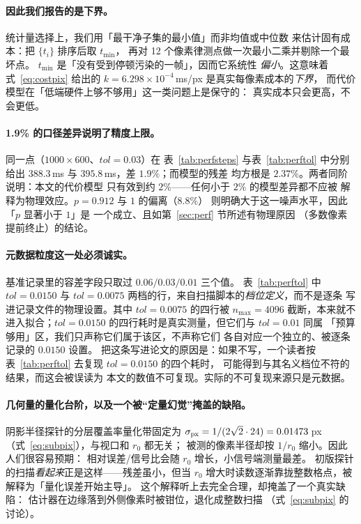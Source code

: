\paragraph{因此我们报告的是下界。}
统计量选择上，我们用「最干净子集的最小值」而非均值或中位数
来估计固有成本：把 $\{t_i\}$ 排序后取 $t_{\min}$，
再对 12 个像素律测点做一次最小二乘并剔除一个最坏点。
$t_{\min}$ 是「没有受到停顿污染的一帧」，因而它系统性
\emph{偏小}。这意味着式~\eqref{eq:costpix} 给出的
$k=6.298\times10^{-4}$\,ms/px 是真实每像素成本的\emph{下界}，
而代价模型在「低端硬件上够不够用」这一类问题上是保守的：
真实成本只会更高，不会更低。

\paragraph{1.9\% 的口径差异说明了精度上限。}
同一点（$1000\times600$、$tol=0.03$）在
表~\ref{tab:perfsteps} 与表~\ref{tab:perftol} 中分别给出
$388.3$\,ms 与 $395.8$\,ms，差 $1.9\%$；而模型的残差
均方根是 $2.37\%$。两者同阶说明：本文的代价模型
只有效到约 $2\%$——任何小于 $2\%$ 的模型差异都不应被
解释为物理效应。$p=0.912$ 与 $1$ 的偏离（$8.8\%$）
则明确大于这一噪声水平，因此「$p$ 显著小于 $1$」是
一个成立、且如第~\ref{sec:perf} 节所述有物理原因
（多数像素提前终止）的结论。

\paragraph{元数据粒度这一处必须诚实。}
基准记录里的容差字段只取过 $0.06/0.03/0.01$ 三个值。
表~\ref{tab:perftol} 中 $tol=0.0150$ 与 $tol=0.0075$
两档的行，来自扫描脚本的\emph{档位定义}，而不是逐条
写进记录文件的物理设置。其中 $tol=0.0075$ 的四行被
$n_{\max}=4096$ 截断，本来就不进入拟合；$tol=0.0150$
的四行耗时是真实测量，但它们与 $tol=0.01$ 同属
「预算够用」区，我们只声称它们属于该区，不声称它们
各自对应一个独立的、被逐条记录的 $0.0150$ 设置。
把这条写进论文的原因是：如果不写，一个读者按
表~\ref{tab:perftol} 去复现 $tol=0.0150$ 的四个耗时，
可能得到与其名义档位不符的结果，而这会被误读为
本文的数值不可复现。实际的不可复现来源只是元数据。

\paragraph{几何量的量化台阶，以及一个被“定量幻觉”掩盖的缺陷。}
阴影半径探针的分层覆盖率量化带固定为
$\sigma_{\rm px}=1/(2\sqrt2\cdot24)=0.01473$\,px
（式~\eqref{eq:subpix}），与视口和 $r_0$ 都无关；
被测的像素半径却按 $1/r_0$ 缩小。因此人们很容易预期：
相对误差/信号比会随 $r_0$ 增长，小信号端测量最差。
初版探针的扫描\emph{看起来}正是这样——残差虽小，但当
$r_0$ 增大时读数逐渐靠拢整数格点，被解释为「量化误差开始主导」。
这个解释听上去完全合理，却掩盖了一个真实缺陷：
估计器在边缘落到外侧像素时被钳位，退化成整数扫描
（式~\eqref{eq:subpix} 的讨论）。

